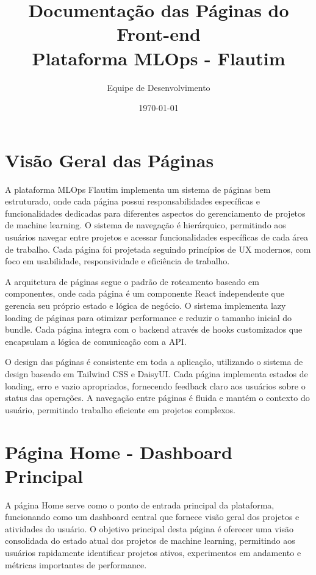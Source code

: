 \documentclass[12pt,a4paper]{article}
\begin{document}
\title{\Huge\textbf{Documentação das Páginas do Front-end}\\\vspace{0.5cm}\Large Plataforma MLOps - Flautim}
\author{Equipe de Desenvolvimento}
\date{\today}

\maketitle

\tableofcontents
\newpage

\section{Visão Geral das Páginas}

A plataforma MLOps Flautim implementa um sistema de páginas bem estruturado, onde cada página possui responsabilidades específicas e funcionalidades dedicadas para diferentes aspectos do gerenciamento de projetos de machine learning. O sistema de navegação é hierárquico, permitindo aos usuários navegar entre projetos e acessar funcionalidades específicas de cada área de trabalho. Cada página foi projetada seguindo princípios de UX modernos, com foco em usabilidade, responsividade e eficiência de trabalho.

A arquitetura de páginas segue o padrão de roteamento baseado em componentes, onde cada página é um componente React independente que gerencia seu próprio estado e lógica de negócio. O sistema implementa lazy loading de páginas para otimizar performance e reduzir o tamanho inicial do bundle. Cada página integra com o backend através de hooks customizados que encapsulam a lógica de comunicação com a API.

O design das páginas é consistente em toda a aplicação, utilizando o sistema de design baseado em Tailwind CSS e DaisyUI. Cada página implementa estados de loading, erro e vazio apropriados, fornecendo feedback claro aos usuários sobre o status das operações. A navegação entre páginas é fluida e mantém o contexto do usuário, permitindo trabalho eficiente em projetos complexos.

\section{Página Home - Dashboard Principal}

A página Home serve como o ponto de entrada principal da plataforma, funcionando como um dashboard central que fornece visão geral dos projetos e atividades do usuário. O objetivo principal desta página é oferecer uma visão consolidada do estado atual dos projetos de machine learning, permitindo aos usuários rapidamente identificar projetos ativos, experimentos em andamento e métricas importantes de performance.
\end{document}
